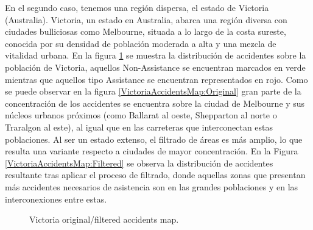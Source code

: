 \documentclass{uathesis-es}
\begin{document}
{En el segundo caso, tenemos una región dispersa, el estado de Victoria (Australia). Victoria, un estado en Australia, abarca una región diversa con ciudades bulliciosas como Melbourne, situada a lo largo de la costa sureste, conocida por su densidad de población moderada a alta y una mezcla de vitalidad urbana. En la figura \ref{VictoriaAccidentsMap} se muestra la distribución de accidentes sobre la población de Victoria, aquellos Non-Assistance se encuentran marcados en verde mientras que aquellos tipo Assistance se encuentran representados en rojo. Como se puede observar en la figura \ref{VictoriaAccidentsMap:Original} gran parte de la concentración de los accidentes se encuentra sobre la ciudad de Melbourne y sus núcleos urbanos próximos (como Ballarat al oeste, Shepparton al norte o Traralgon al este), al igual que en las carreteras que interconectan estas poblaciones. Al ser un estado extenso, el filtrado de áreas es más amplio, lo que resulta una variante respecto a ciudades de mayor concentración. En la Figura \ref{VictoriaAccidentsMap:Filtered} se observa la distribución de accidentes resultante tras aplicar el proceso de filtrado, donde aquellas zonas que presentan más accidentes necesarios de asistencia son en las grandes poblaciones y en las interconexiones entre estas.


 \begin{figure}[H]
     \centering
     \caption{Victoria original/filtered accidents map.}
     \label{VictoriaAccidentsMap}
 \end{figure}


}
\end{document}
